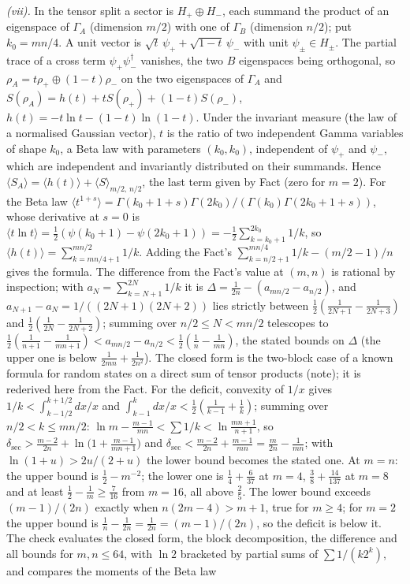 \emph{(vii).} In the tensor split a sector is $H_{+} \oplus H_{-}$, each summand the product of an eigenspace of $\Gamma_{A}$ (dimension $m/2$) with one of $\Gamma_{B}$ (dimension $n/2$); put $k_{0} = mn/4$. A unit vector is $\sqrt{t}\,\psi_{+} + \sqrt{1-t}\,\psi_{-}$ with unit $\psi_{\pm} \in H_{\pm}$. The partial trace of a cross term $\psi_{+}\psi_{-}^{\dagger}$ vanishes, the two $B$ eigenspaces being orthogonal, so $\rho_{A} = t\rho_{+} \oplus (1-t)\rho_{-}$ on the two eigenspaces of $\Gamma_{A}$ and $S(\rho_{A}) = h(t) + tS(\rho_{+}) + (1-t)S(\rho_{-})$, $h(t) = -t\ln t - (1-t)\ln(1-t)$. Under the invariant measure (the law of a normalised Gaussian vector), $t$ is the ratio of two independent Gamma variables of shape $k_{0}$, a Beta law with parameters $(k_{0}, k_{0})$, independent of $\psi_{+}$ and $\psi_{-}$, which are independent and invariantly distributed on their summands. Hence $\langle S_{A}\rangle = \langle h(t)\rangle + \langle S\rangle_{m/2,\,n/2}$, the last term given by Fact  (zero for $m = 2$). For the Beta law $\langle t^{1+s}\rangle = \Gamma(k_{0}+1+s)\Gamma(2k_{0})/(\Gamma(k_{0})\Gamma(2k_{0}+1+s))$, whose derivative at $s = 0$ is $\langle t\ln t\rangle = \tfrac12(\psi(k_{0}+1) - \psi(2k_{0}+1)) = -\tfrac12\sum_{k=k_{0}+1}^{2k_{0}}1/k$, so $\langle h(t)\rangle = \sum_{k=mn/4+1}^{mn/2}1/k$. Adding the Fact's $\sum_{k=n/2+1}^{mn/4}1/k - (m/2 - 1)/n$ gives the formula. The difference from the Fact's value at $(m,n)$ is rational by inspection; with $a_{N} = \sum_{k=N+1}^{2N}1/k$ it is $\Delta = \tfrac{1}{2n} - (a_{mn/2} - a_{n/2})$, and $a_{N+1} - a_{N} = 1/((2N+1)(2N+2))$ lies strictly between $\tfrac12(\tfrac{1}{2N+1} - \tfrac{1}{2N+3})$ and $\tfrac12(\tfrac{1}{2N} - \tfrac{1}{2N+2})$; summing over $n/2 \le N < mn/2$ telescopes to $\tfrac12(\tfrac{1}{n+1} - \tfrac{1}{mn+1}) < a_{mn/2} - a_{n/2} < \tfrac12(\tfrac1n - \tfrac{1}{mn})$, the stated bounds on $\Delta$ (the upper one is below $\tfrac{1}{2mn} + \tfrac{1}{2n^{2}}$). The closed form is the two-block case of a known formula for random states on a direct sum of tensor products (note); it is rederived here from the Fact. For the deficit, convexity of $1/x$ gives $1/k < \int_{k-1/2}^{k+1/2}dx/x$ and $\int_{k-1}^{k}dx/x < \tfrac12(\tfrac{1}{k-1} + \tfrac1k)$; summing over $n/2 < k \le mn/2$: $\ln m - \tfrac{m-1}{mn} < \sum 1/k < \ln\frac{mn+1}{n+1}$, so $\delta_{\mathrm{sec}} > \tfrac{m-2}{2n} + \ln\bigl(1 + \tfrac{m-1}{mn+1}\bigr)$ and $\delta_{\mathrm{sec}} < \tfrac{m-2}{2n} + \tfrac{m-1}{mn} = \tfrac{m}{2n} - \tfrac{1}{mn}$; with $\ln(1+u) > 2u/(2+u)$ the lower bound becomes the stated one. At $m = n$: the upper bound is $\tfrac12 - m^{-2}$; the lower one is $\tfrac14 + \tfrac{6}{37}$ at $m = 4$, $\tfrac38 + \tfrac{14}{137}$ at $m = 8$ and at least $\tfrac12 - \tfrac1m \ge \tfrac{7}{16}$ from $m = 16$, all above $\tfrac25$. The lower bound exceeds $(m-1)/(2n)$ exactly when $n(2m - 4) > m + 1$, true for $m \ge 4$; for $m = 2$ the upper bound is $\tfrac{1}{n} - \tfrac{1}{2n} = \tfrac{1}{2n} = (m-1)/(2n)$, so the deficit is below it. The check evaluates the closed form, the block decomposition, the difference and all bounds for $m, n \le 64$, with $\ln 2$ bracketed by partial sums of $\sum 1/(k2^{k})$, and compares the moments of the Beta law 
